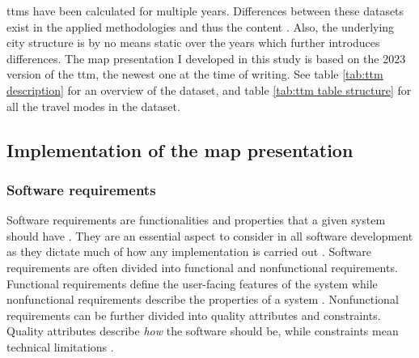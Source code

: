 
\acrshort{ttm}s have been calculated for multiple years.
Differences between these datasets exist in the applied methodologies and thus the content
\parencite{ten2020}.
Also, the underlying city structure is by no means static over the years
which further introduces differences.
The map presentation I developed in this study
is based on the 2023 version of the \acrshort{ttm},
the newest one at the time of writing.
See table \ref{tab:ttm description} for an overview of the dataset,
and table \ref{tab:ttm table structure} for all the travel modes in the dataset.







\subsection{Implementation of the map presentation}

\subsubsection{Software requirements}


Software requirements are functionalities and properties
that a given system should have \parencite{chu2009}.
They are an essential aspect to consider in all software development
as they dictate much of how any implementation is carried out \parencite{saq2020}.
Software requirements are often divided into
functional and nonfunctional requirements.
Functional requirements define the user-facing features of the system
while nonfunctional requirements describe the properties of a system
\parencite{chu2009}.
Nonfunctional requirements can be further divided into
quality attributes and constraints.
Quality attributes describe \textit{how} the software should be,
while constraints mean technical limitations \parencite{chu2009}.

